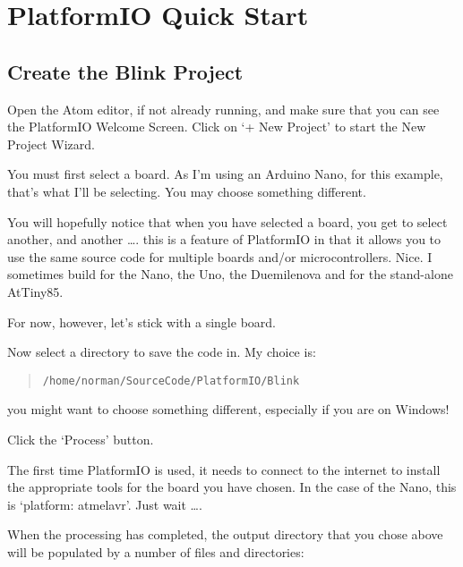 \section{PlatformIO Quick Start}\label{platformio-quick-start}

\subsection{Create the Blink Project}\label{create-the-blink-project}

Open the Atom editor, if not already running, and make sure that you can
see the PlatformIO Welcome Screen. Click on `+ New Project' to start the
New Project Wizard.

You must first select a board. As I'm using an Arduino Nano, for this
example, that's what I'll be selecting. You may choose something
different.

You will hopefully notice that when you have selected a board, you get
to select another, and another \ldots{}. this is a feature of PlatformIO
in that it allows you to use the same source code for multiple boards
and/or microcontrollers. Nice. I sometimes build for the Nano, the Uno,
the Duemilenova and for the stand-alone AtTiny85.

For now, however, let's stick with a single board.

Now select a directory to save the code in. My choice is:

\begin{quote}
\lstinline!/home/norman/SourceCode/PlatformIO/Blink!
\end{quote}

you might want to choose something different, especially if you are on
Windows!

Click the `Process' button.

The first time PlatformIO is used, it needs to connect to the internet
to install the appropriate tools for the board you have chosen. In the
case of the Nano, this is `platform: atmelavr'. Just wait \ldots{}.

When the processing has completed, the output directory that you chose
above will be populated by a number of files and directories:

